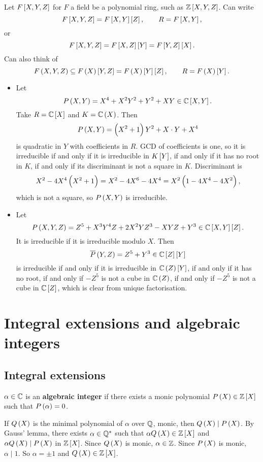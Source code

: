 \begin{example*}
Let $ F\sbr{X, Y, Z} $ for $ F $ a field be a polynomial ring, such as $ \Z\sbr{X, Y, Z} $. Can write
$$ F\sbr{X, Y, Z} = F\sbr{X, Y}\sbr{Z}, \qquad R = F\sbr{X, Y}, $$
or
$$ F\sbr{X, Y, Z} = F\sbr{X, Z}\sbr{Y} = F\sbr{Y, Z}\sbr{X}. $$
Can also think of
$$ F\br{X, Y, Z} \subseteq F\br{X}\sbr{Y, Z} = F\br{X}\sbr{Y}\sbr{Z}, \qquad R = F\br{X}\sbr{Y}. $$
\begin{itemize}
\item Let
$$ P\br{X, Y} = X^4 + X^2Y^2 + Y^2 + XY \in \C\sbr{X, Y}. $$
Take $ R = \C\sbr{X} $ and $ K = \C\br{X} $. Then
$$ P\br{X, Y} = \br{X^2 + 1}Y^2 + X \cdot Y + X^4 $$
is quadratic in $ Y $ with coefficients in $ R $. GCD of coefficients is one, so it is irreducible if and only if it is irreducible in $ K\sbr{Y} $, if and only if it has no root in $ K $, if and only if its discriminant is not a square in $ K $. Discriminant is
$$ X^2 - 4X^4\br{X^2 + 1} = X^2 - 4X^6 - 4X^4 = X^2\br{1 - 4X^4 - 4X^2}, $$
which is not a square, so $ P\br{X, Y} $ is irreducible.
\item Let
$$ P\br{X, Y, Z} = Z^5 + X^3Y^4Z + 2X^2YZ^3 - XYZ + Y^3 \in \C\sbr{X, Y}\sbr{Z}. $$
It is irreducible if it is irreducible modulo $ X $. Then
$$ \overline{P}\br{Y, Z} = Z^5 + Y^3 \in \C\sbr{Z}\sbr{Y} $$
is irreducible if and only if it is irreducible in $ \C\br{Z}\sbr{Y} $, if and only if it has no root, if and only if $ -Z^5 $ is not a cube in $ \C\br{Z} $, if and only if $ -Z^5 $ is not a cube in $ \C\sbr{Z} $, which is clear from unique factorisation.
\end{itemize}
\end{example*}

\pagebreak

\section{Integral extensions and algebraic integers}

\subsection{Integral extensions}

\begin{definition}
$ \alpha \in \mathbb{C} $ is an \textbf{algebraic integer} if there exists a monic polynomial $ P\br{X} \in \Z\sbr{X} $ such that $ P\br{\alpha} = 0 $.
\end{definition}

\begin{note*}
If $ Q\br{X} $ is the minimal polynomial of $ \alpha $ over $ \mathbb{Q} $, monic, then $ Q\br{X} \mid P\br{X} $. By Gauss' lemma, there exists $ \alpha \in \mathbb{Q}^* $ such that $ \alpha Q\br{X} \in \Z\sbr{X} $ and $ \alpha Q\br{X} \mid P\br{X} $ in $ \Z\sbr{X} $. Since $ Q\br{X} $ is monic, $ \alpha \in \mathbb{Z} $. Since $ P\br{X} $ is monic, $ \alpha \mid 1 $. So $ \alpha = \pm 1 $ and $ Q\br{X} \in \Z\sbr{X} $.
\end{note*}

